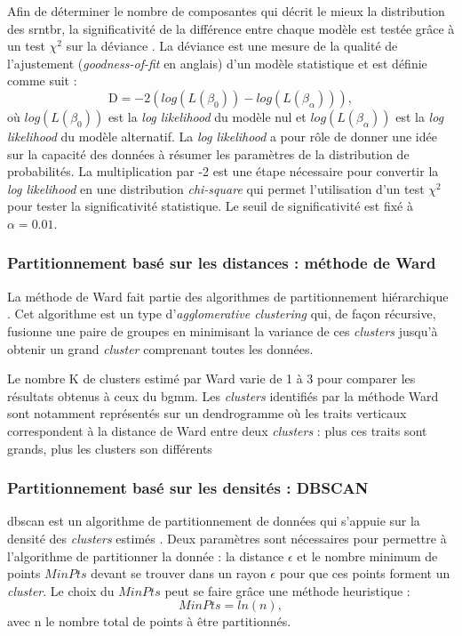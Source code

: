 Afin de déterminer le nombre de composantes qui décrit le mieux la distribution des \gls{srntbr}, la significativité de la différence entre chaque 
modèle est testée grâce à un test $\chi^2$ sur la déviance \citep{James2013}. La déviance est une mesure de la qualité de l'ajustement (\textit{goodness-of-fit} 
en anglais) d'un modèle statistique et est définie comme suit :
\begin{equation}
\label{eq:tbr_deviance}
\text{D} = -2(log(L(\beta_{0})) - log(L(\beta_{\alpha}))),
\end{equation}
où $log(L(\beta_{0}))$ est la \textit{log likelihood} du modèle nul et $log(L(\beta_{\alpha}))$ est la \textit{log likelihood} du modèle alternatif. 
La \textit{log likelihood} a pour rôle de donner une idée sur la capacité des données à résumer les paramètres de la distribution de probabilités. 
La multiplication par -2 est une étape nécessaire pour convertir la \textit{log likelihood} en une distribution \textit{chi-square} qui permet 
l'utilisation d'un test $\chi^2$ pour tester la significativité statistique. Le seuil de significativité est fixé à $\alpha = 0.01$.

\subsubsection{Partitionnement basé sur les distances : méthode de Ward}
La méthode de Ward fait partie des algorithmes de partitionnement hiérarchique \citep{Ward1963}. 
Cet algorithme est un type d'\textit{agglomerative clustering} qui, de façon récursive, fusionne une paire de groupes 
en minimisant la variance de ces \textit{clusters} jusqu'à obtenir un grand \textit{cluster} comprenant toutes les données.

Le nombre K de clusters estimé par Ward varie de 1 à 3 pour comparer les résultats obtenus à ceux du \gls{bgmm}. Les \textit{clusters}
identifiés par la méthode Ward sont notamment représentés sur un dendrogramme où les traits verticaux correspondent à la distance de Ward entre 
deux \textit{clusters} : plus ces traits sont grands, plus les clusters son différents

\subsubsection{Partitionnement basé sur les densités : DBSCAN}
\gls{dbscan} est un algorithme de partitionnement de données qui s'appuie sur la densité des \textit{clusters} estimés \citep{Ester1996}. 
Deux paramètres sont nécessaires pour permettre à l'algorithme de partitionner la donnée : la distance $\epsilon$ et le nombre minimum de points 
$MinPts$ devant se trouver dans un rayon $\epsilon$ pour que ces points forment un \textit{cluster}. 
Le choix du $MinPts$ peut se faire grâce une méthode heuristique :
\begin{equation}
\label{eq:tbr_dbscan}
MinPts = ln(n),
\end{equation}
avec n le nombre total de points à être partitionnés.

